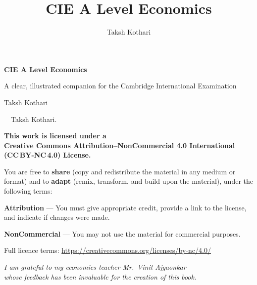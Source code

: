 \documentclass[11pt, a4paper, twoside]{book}
\title{CIE A Level Economics}
\author{Taksh Kothari}
\date{}
\begin{document}
\RaggedRight        %
\pagestyle{empty}

\null
{}\textheight
\begin{center}
  {\sffamily\bfseries\fontsize{32pt}{36pt}\selectfont\color{NavyPrimary}%
    CIE A Level Economics\par}
  \vspace{1.0em}
  {\sffamily\normalsize\color{MidBlue}%
    A clear, illustrated companion for the Cambridge International Examination\par}
  \vspace{2.2em}
  {\sffamily\large\color{NavyPrimary}Taksh Kothari\par}
\end{center}
\vfill
\newpage

\pagestyle{empty}
\null
\vfill
\begin{center}
  {\sffamily\color{SubtleGray}
    \textcopyright\ \the\year\ Taksh Kothari.\par
    \vspace{1.2em}
    {\color{TextDark}\bfseries This work is licensed under a\\
    Creative Commons Attribution--NonCommercial 4.0 International\\
    (CC\,BY-NC\,4.0) License.}\par
    \vspace{1.2em}
    You are free to \textbf{share} (copy and redistribute the material in any
    medium or format) and to \textbf{adapt} (remix, transform, and build upon
    the material), under the following terms:\par
    \vspace{0.8em}
    \textbf{Attribution} --- You must give appropriate credit, provide a link
    to the license, and indicate if changes were made.\par
    \vspace{0.4em}
    \textbf{NonCommercial} --- You may not use the material for commercial
    purposes.\par
    \vspace{1.2em}
    Full licence terms: \url{https://creativecommons.org/licenses/by-nc/4.0/}}
\end{center}
\vfill
\clearpage

\pagestyle{empty}
\null
\vfill
\begin{center}
  {\Large\color{TextDark}\itshape
    I am grateful to my economics teacher Mr.\ Vinit Ajgaonkar\\
    whose feedback has been invaluable for the creation of this book.}
\end{center}
\vfill
\clearpage
\end{document}
